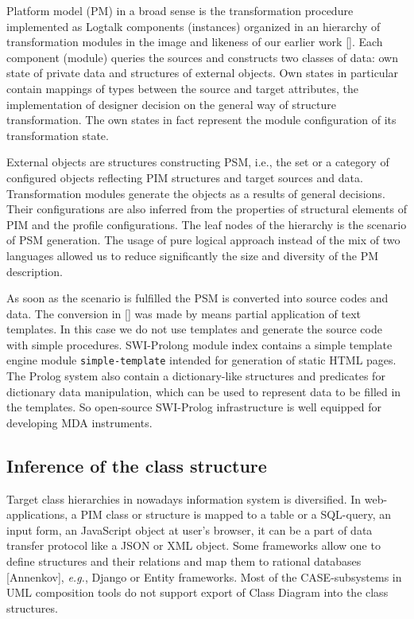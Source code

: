 \documentclass[conference,a4paper]{IEEEtran}
\begin{document}
Platform model (PM) in a broad sense is the transformation procedure implemented as Logtalk components (instances) organized in an hierarchy of transformation modules in the image and likeness of our earlier work [].  Each component (module) queries the sources and constructs two classes of data: own state of private data and structures of external objects.  Own states in particular contain mappings of types between the source and target attributes, the implementation of designer decision on the general way of structure transformation.  The own states in fact represent the module configuration of its transformation state.

External objects are structures constructing PSM, i.e., the set or a category of configured objects reflecting PIM structures and target sources and data.  Transformation modules generate the objects as a results of general decisions.  Their configurations are also inferred from the properties of structural elements of PIM and the profile configurations.  The leaf nodes of the hierarchy is the scenario of PSM generation.  The usage of pure logical approach instead of the mix of two languages allowed us to reduce significantly the size and diversity of the PM description.

As soon as the scenario is fulfilled the PSM is converted into source codes and data.  The conversion in [] was made by means partial application of text templates.  In this case we do not use templates and generate the source code with simple procedures.  SWI-Prolong module index contains a simple template engine module \texttt{simple-template} intended for generation of static HTML pages.  The Prolog system also contain a dictionary-like structures and predicates for dictionary data manipulation, which can be used to represent data to be filled in the templates.  So open-source SWI-Prolog infrastructure is well equipped for developing MDA instruments.

\subsection{Inference of the class structure}
\label{sec:infstru}

Target class hierarchies in nowadays information system is diversified.  In web-applications, a PIM class or structure is mapped to a table or a SQL-query, an input form, an JavaScript object at user's browser, it can be a part of data transfer protocol like a JSON or XML object.  Some frameworks allow one to define structures and their relations and map them to rational databases [Annenkov], \emph{e.g.}, Django or Entity frameworks.  Most of the CASE-subsystems in UML composition tools do not support export of Class Diagram into the class structures.
\end{document}
